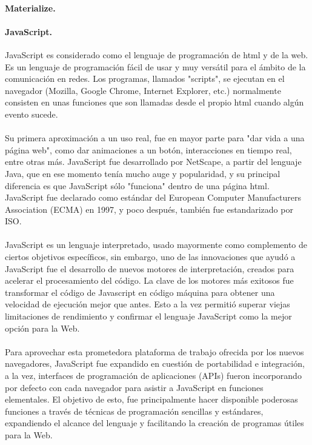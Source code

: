 \documentclass[12pt, a4paper, titlepage]{article}
\begin{document}
				\paragraph{Materialize. \\}
				
				
				
				\paragraph {JavaScript. \\}
				JavaScript es considerado como el lenguaje de programación de \acrshort{html} y de la web. Es un lenguaje de programación fácil de usar y muy versátil para el ámbito de la comunicación en redes. Los programas, llamados "scripts", se ejecutan en el navegador (Mozilla, Google Chrome, Internet Explorer, etc.) normalmente consisten en unas funciones que son llamadas desde el propio \acrshort{html} cuando algún evento sucede.\\\\
				Su primera aproximación a un uso real, fue en mayor parte para "dar vida a una página web", como dar animaciones a un botón, interacciones en tiempo real, entre otras más. 
				JavaScript fue desarrollado por \Gls{NetScape}, a partir del lenguaje Java, que en ese momento tenía mucho auge y popularidad, y su principal diferencia es que JavaScript sólo "funciona" dentro de una página \acrshort{html}.\\
				JavaScript fue declarado como estándar del European Computer Manufacturers Association (ECMA) en 1997, y poco después, también fue estandarizado por ISO.\cite{refJavaScript} \\\\ 
				JavaScript es un lenguaje interpretado, usado mayormente como complemento de ciertos objetivos específicos, sin embargo, uno de las innovaciones que ayudó a JavaScript fue el desarrollo de nuevos motores de interpretación, creados para acelerar el procesamiento del código. La clave de los motores más exitosos fue transformar el código de Javascript en código máquina para obtener una velocidad de ejecución mejor que antes. Esto a la vez permitió superar viejas limitaciones de rendimiento y confirmar el lenguaje JavaScript como la mejor opción para la Web.\\\\
				Para aprovechar esta prometedora plataforma de trabajo ofrecida por los nuevos navegadores, JavaScript fue expandido en cuestión de portabilidad e integración, a la vez, interfaces de programación de aplicaciones (APIs) fueron incorporando por defecto con cada navegador para asistir a JavaScript en funciones elementales. El objetivo de esto, fue principalmente hacer disponible poderosas funciones a través de técnicas de programación sencillas y estándares, expandiendo el alcance del lenguaje y facilitando la creación de programas útiles para la Web.\cite{refElGranLibro}
				
\end{document}
